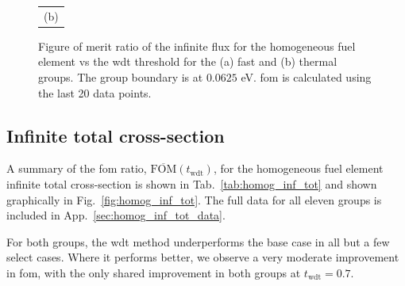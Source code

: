 \begin{figure}[hbtp]
\begin{tabular}{c}
    (b) 
  \end{tabular}
  \caption[Figure of merit ratio of the infinite flux for the
  homogeneous fuel element]{Figure of merit ratio of the infinite flux
    for the homogeneous fuel element vs the
    \gls{wdt} threshold for the (a) fast and (b) thermal 
    groups. The group boundary is at $0.0625$ eV. \gls{fom} is
    calculated using the last 20 data points.}
  \label{fig:homog_inf_flx}
\end{figure}

\subsection{Infinite total cross-section}
\label{sec:homog_inf_total}

A summary of the \gls{fom} ratio,
$\overline{\mathrm{FOM}}(t_{\mathrm{wdt}})$, for the homogeneous fuel element
 infinite total cross-section is shown in Tab.~\ref{tab:homog_inf_tot} and shown
graphically in Fig.~\ref{fig:homog_inf_tot}. The full data for all
eleven groups is included in App.~\ref{sec:homog_inf_tot_data}.

For both groups, the \gls{wdt} method underperforms the base case in
all but a few select cases. Where it performs better, we observe a very
moderate improvement in \gls{fom}, with the only shared improvement in
both groups at $t_{\mathrm{wdt}} = 0.7$.

